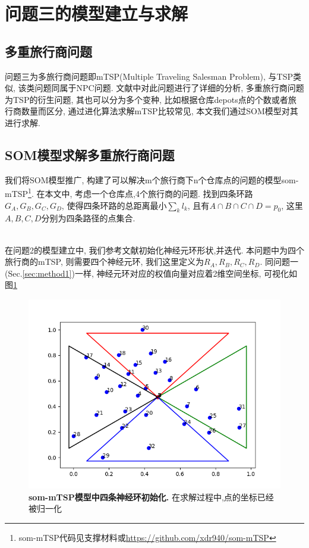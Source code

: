 \section{问题三的模型建立与求解}



\subsection{多重旅行商问题}
问题三为多旅行商问题即mTSP(Multiple Traveling Salesman Problem), 与TSP类似, 该类问题同属于NPC问题. 文献\cite{surveymtsp}中对此问题进行了详细的分析, 多重旅行商问题为TSP的衍生问题, 其也可以分为多个变种, 比如根据仓库depots点的个数或者旅行商数量而区分\cite{mtsp-genetic}, 通过进化算法求解mTSP比较常见\cite{AdlemanTSP,mtsp-genetic}, 本文我们通过SOM模型对其进行求解.



\subsection{SOM模型求解多重旅行商问题}

我们将SOM模型推广, 构建了可以解决m个旅行商下n个仓库点的问题的模型som-mTSP\footnote{som-mTSP代码见支撑材料或\url{https://github.com/xdr940/som-mTSP}}. 在本文中, 考虑一个仓库点,4个旅行商的问题. 找到四条环路$G_A, G_B,G_C,G_D$, 使得四条环路的总距离最小$\sum\limits_k l_k$, 且有$A \cap B \cap C \cap D = {p_0}$, 这里$A,B,C,D$分别为四条路径的点集合.

\\

在问题2的模型建立中, 我们参考文献\cite{isom2008}初始化神经元环形状,并迭代. 本问题中为四个旅行商的mTSP, 则需要四个神经元环, 我们这里定义为$R_A,R_B,R_C,R_D$. 同问题一(Sec.\ref{sec:method1})一样, 神经元环对应的权值向量对应着2维空间坐标, 可视化如图\ref{fig:init2}
\begin{figure}[h]
    \begin{center}
        \includegraphics[width=0.55\linewidth]{fig/init2}
    \end{center}
    \caption{\textbf{som-mTSP模型中四条神经环初始化.} 在求解过程中,点的坐标已经被归一化 }
        \label{fig:init2}
  \end{figure}

